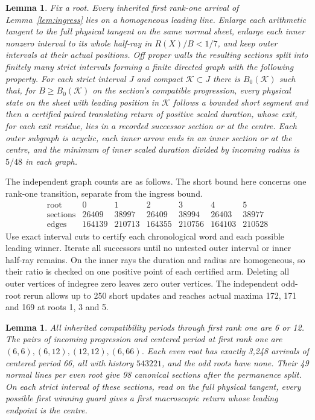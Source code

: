 \documentclass[11pt,reqno]{amsart}
\newtheorem{lemma}[theorem]{Lemma}
\theoremstyle{definition}
\begin{document}
\begin{lemma}\label{lem:lines}
Fix a root. Every inherited first rank-one arrival of
Lemma~\ref{lem:ingress} lies on a homogeneous leading line. Enlarge each
arithmetic tangent to the full physical tangent on the same normal sheet,
enlarge each inner nonzero interval to its whole half-ray in
\(R(X)/B<1/7\), and keep outer intervals at their actual positions. Off
proper walls the resulting sections split into finitely many strict
intervals forming a finite directed graph with the following property.
For each strict interval \(J\) and compact \(\mathcal K\subset J\) there is
\(B_0(\mathcal K)\) such that, for \(B\ge B_0(\mathcal K)\) on the
section's compatible progression, every physical state on the sheet with
leading position in \(\mathcal K\) follows a bounded short segment and then
a certified paired translating return of positive scaled duration, whose
exit, for each exit residue, lies in a recorded successor section or at
the centre. Each outer subgraph is acyclic, each inner arrow ends in an
inner section or at the centre, and the minimum of inner scaled duration
divided by incoming radius is \(5/48\) in each graph.
\end{lemma}

The independent graph counts are as follows. The short bound here
concerns one rank-one transition, separate from the ingress bound.
\[
\begin{array}{c|rrrrrr}
  \text{root}&0&1&2&3&4&5\\ \hline
  \text{sections}&26409&38997&26409&38994&26403&38977\\
  \text{edges}&164139&210713&164355&210756&164103&210528
\end{array}
\]
Use exact interval cuts to certify each chronological word and each
possible leading winner. Iterate all successors until no untested
outer interval or inner half-ray remains. On the inner rays the
duration and radius are homogeneous, so their ratio is checked on
one positive point of each certified arm. Deleting all outer
vertices of indegree zero leaves zero outer vertices. The
independent odd-root rerun allows up to 250 short updates and
reaches actual maxima 172, 171 and 169 at roots 1, 3 and 5.

\begin{lemma}\label{lem:periods}
All inherited compatibility periods through first rank one are 6 or
12. The pairs of incoming progression and centered period at first rank
one are \((6,6),(6,12),(12,12),(6,66)\). Each even root has exactly
3,248 arrivals of centered period 66, all with history \(543221\), and
the odd roots have none. Their 49 normal lines per even root give 98
canonical sections after the permanence split. On each strict interval
of these sections, read on the full physical tangent, every possible
first winning guard gives a first macroscopic return whose leading
endpoint is the centre.
\end{lemma}
\end{document}
